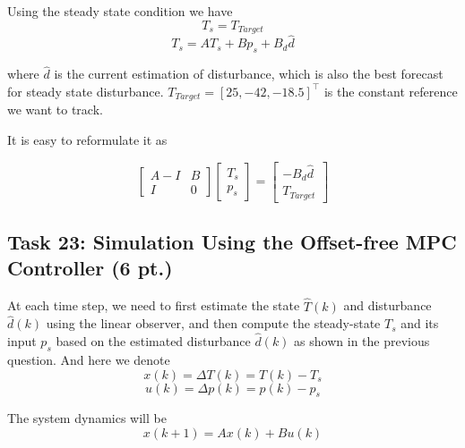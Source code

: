\documentclass[a4paper,twoside,11pt]{article}
\numberwithin{equation}{section}
\begin{document}
Using the steady state condition we have
\begin{equation}
    T_s = T_{Target}
\end{equation}
\begin{equation}
    T_s = AT_s + Bp_s +B_d \hat{d}
\end{equation}

where $\hat{d}$ is the current estimation of disturbance, which is also the best forecast for steady state disturbance. $T_{Target} = [25, -42, -18.5]^\top$ is the constant reference we want to track.

It is easy to reformulate it as

\begin{equation}
    \begin{bmatrix}
    A-I & B \\
    I & 0
    \end{bmatrix}
    \begin{bmatrix}
    T_s \\
    p_s
    \end{bmatrix}
    =
    \begin{bmatrix}
    -B_d \hat{d} \\
    T_{Target}
    \end{bmatrix}
\end{equation}


\subsection{Task 23: Simulation Using the Offset-free MPC Controller (6 pt.)}

At each time step, we need to first estimate the state $\hat{T}(k)$ and disturbance $\hat{d}(k)$ using the linear observer, and then compute the steady-state $T_s$ and its input $p_s$ based on the estimated disturbance $\hat{d}(k)$ as shown in the previous question. And here we denote
\begin{equation*}
    x(k) = \Delta T(k) = T(k) - T_s
\end{equation*}
\begin{equation*}
    u(k) = \Delta p(k) = p(k) - p_s
\end{equation*}

The system dynamics will be
\begin{equation}
    x(k+1) = Ax(k) + Bu(k)
\end{equation}
\end{document}
